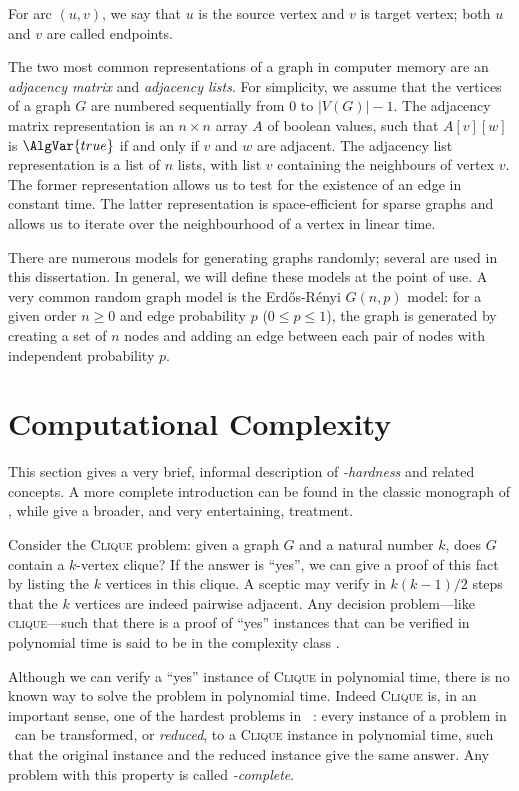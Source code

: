 For arc $(u,v)$, we say that $u$ is the source vertex and $v$ is target vertex; both
$u$ and $v$ are called endpoints.

The two most common representations of a graph in computer memory
are an \emph{adjacency matrix} and \emph{adjacency lists}.  For simplicity,
we assume that the vertices of a graph $G$ are numbered sequentially from
0 to $|V(G)| - 1$. The adjacency matrix representation is an $n \times n$
array $A$ of boolean values, such that $A[v][w]$ is $\AlgVar{true}$ if and
only if $v$ and $w$ are adjacent.  The adjacency list representation
is a list of $n$ lists, with list $v$ containing the neighbours of vertex $v$.
The former representation allows us to test for the existence of an edge in constant
time.  The latter representation is space-efficient for sparse graphs
and allows us to iterate over the neighbourhood of a vertex in linear time.

There are numerous models for generating graphs randomly; several are used
in this dissertation. In general, we will define these models at the point
of use.  A very common random graph model is the Erd\H{o}s-Rényi $G(n,p)$
model: for a given order $n \geq 0$ and edge probability $p$ ($0 \leq p \leq 1$),
the graph is generated by creating a set of $n$ nodes and adding an edge
between each pair of nodes with independent probability $p$.

\section{Computational Complexity}\label{sec:complexity}

This section gives a very brief, informal description of
\emph{\NP-hardness} and related concepts. A more complete introduction can be
found in the classic monograph of \citet{DBLP:books/fm/GareyJ79},
while \citet{moore2011nature} give a broader, and very entertaining,
treatment.

Consider the \textsc{Clique} problem: given a graph $G$ and a natural number $k$,
does $G$ contain a $k$-vertex clique?  If the answer is ``yes'', we can give a proof
of this fact by listing the $k$ vertices in this clique.  A sceptic may verify
in $k(k-1)/2$ steps that the $k$ vertices are indeed pairwise adjacent.  Any decision
problem---like \textsc{clique}---such that there is a proof of ``yes'' instances
that can be verified in polynomial time is said to be in the complexity class \NP.

Although we can verify a ``yes'' instance of \textsc{Clique} in polynomial
time, there is no known way to solve the problem in polynomial time.
Indeed \textsc{Clique} is, in an important sense, one of the hardest problems in \NP\
\citep{DBLP:conf/coco/Karp72}: every instance of a problem in \NP\ can be
transformed, or \emph{reduced}, to a \textsc{Clique} instance in polynomial
time, such that the original instance and the reduced instance give the same
answer.  Any problem with this property is called \emph{\NP-complete}.

